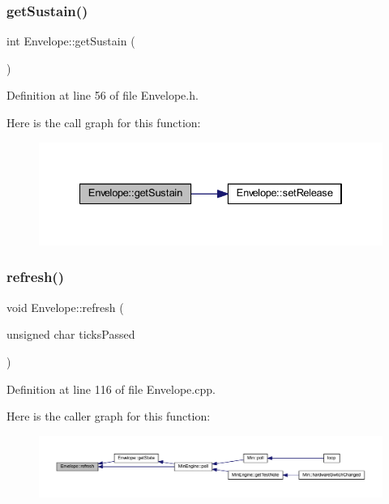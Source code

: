 \subsubsection{\texorpdfstring{get\+Sustain()}{getSustain()}}
{\footnotesize\ttfamily int Envelope\+::get\+Sustain (\begin{DoxyParamCaption}{ }\end{DoxyParamCaption})\hspace{0.3cm}{\ttfamily [inline]}}



Definition at line 56 of file Envelope.\+h.

Here is the call graph for this function\+:
\nopagebreak
\begin{figure}[H]
\begin{center}
\leavevmode
\includegraphics[width=334pt]{d7/df3/class_envelope_a4cc2bb1ba420ecd053c4a1ad8ed0ab7d_cgraph}
\end{center}
\end{figure}
\mbox{\label{class_envelope_ab039016897ae8b1edccd2eec7cb9b7f8}} 
\subsubsection{\texorpdfstring{refresh()}{refresh()}}
{\footnotesize\ttfamily void Envelope\+::refresh (\begin{DoxyParamCaption}\item[{unsigned char}]{ticks\+Passed }\end{DoxyParamCaption})}



Definition at line 116 of file Envelope.\+cpp.

Here is the caller graph for this function\+:
\nopagebreak
\begin{figure}[H]
\begin{center}
\leavevmode
\includegraphics[width=350pt]{d7/df3/class_envelope_ab039016897ae8b1edccd2eec7cb9b7f8_icgraph}
\end{center}
\end{figure}
\mbox{\label{class_envelope_ab21b5747de63336c4a525f3a7e728189}} 
